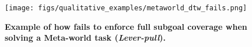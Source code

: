 \begin{figure}
    \centering
    \texttt{[image: figs/qualitative\_examples/metaworld\_dtw\_fails.png]}
    \caption{\small \textbf{Example of how \dtw{} fails to enforce full subgoal coverage when solving a Meta-world task (\textit{Lever-pull}).} }
    \label{fig:meta_dtw_fail}
\end{figure}
